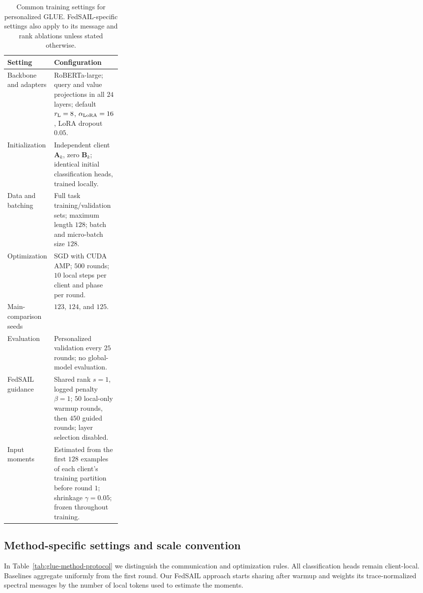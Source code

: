 \documentclass[11pt,letterpaper]{article}
\newcommand{\bA}{\mathbf{A}}
\newcommand{\bB}{\mathbf{B}}
\begin{document}
\begin{table}[!htbp]
    \centering
    \caption{Common training settings for personalized GLUE. FedSAIL-specific
    settings also apply to its message and rank ablations unless stated otherwise.}
    \label{tab:glue-training-protocol}
    \small
    \setlength{\tabcolsep}{5pt}
    \renewcommand{\arraystretch}{1.08}
    \begin{tabular}{@{}p{0.27\linewidth}p{}@{}}
        \toprule
        Setting & Configuration \\
        \midrule
        Backbone and adapters & RoBERTa-large; query and value projections in
        all $24$ layers; default $r_{\rm L}=8$, $\alpha_{\rm LoRA}=16$,
        LoRA dropout $0.05$. \\
        Initialization & Independent client $\bA_k$, zero $\bB_k$;
        identical initial classification heads, trained locally. \\
        Data and batching & Full task training/validation sets;
        maximum length $128$; batch and micro-batch size $128$. \\
        Optimization & SGD with CUDA AMP; $500$ rounds;
        $10$ local steps per client and phase per round. \\
        Main-comparison seeds & $123$, $124$, and $125$. \\
        Evaluation & Personalized validation every $25$ rounds;
        no global-model evaluation. \\
        \midrule
        FedSAIL guidance & Shared rank $s=1$, logged penalty $\beta=1$;
        $50$ local-only warmup rounds, then $450$ guided rounds;
        layer selection disabled. \\
        Input moments & Estimated from the first $128$ examples of each
        client's training partition before round $1$;
        shrinkage $\gamma=0.05$; frozen throughout training. \\
        \bottomrule
    \end{tabular}
\end{table}

\subsection{Method-specific settings and scale convention}

In Table~\ref{tab:glue-method-protocol} we distinguish the communication and
optimization rules. All classification
heads remain client-local. Baselines aggregate uniformly from the first
round. Our FedSAIL approach starts sharing after warmup and weights its trace-normalized
spectral messages by the number of local tokens used to estimate the moments.
\end{document}
